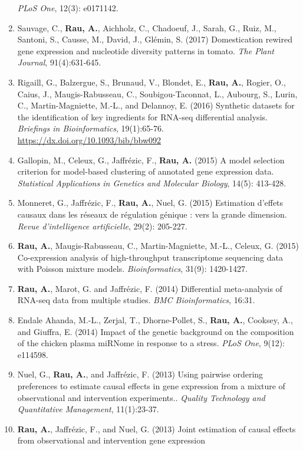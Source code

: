 \documentclass[11pt, a4paper]{awesome-cv}
\begin{document}
\begin{enumerate}
  \emph{PLoS One}, 12(3): e0171142.
\item
  Sauvage, C., \textbf{Rau, A.}, Aichholz, C., Chadoeuf, J., Sarah, G.,
  Ruiz, M., Santoni, S., Causse, M., David, J., Glémin, S. (2017)
  Domestication rewired gene expression and nucleotide diversity
  patterns in tomato. \emph{The Plant Journal}, 91(4):631-645.
\item
  Rigaill, G., Balzergue, S., Brunaud, V., Blondet, E., \textbf{Rau,
  A.}, Rogier, O., Caius, J., Maugis-Rabusseau, C., Soubigou-Taconnat,
  L., Aubourg, S., Lurin, C., Martin-Magniette, M.-L., and Delannoy, E.
  (2016) Synthetic datasets for the identification of key ingredients
  for RNA-seq differential analysis. \emph{Briefings in Bioinformatics},
  19(1):65-76. \url{https://dx.doi.org/10.1093/bib/bbw092}
\item
  Gallopin, M., Celeux, G., Jaffrézic, F., \textbf{Rau, A.} (2015) A
  model selection criterion for model-based clustering of annotated gene
  expression data. \emph{Statistical Applications in Genetics and
  Molecular Biology}, 14(5): 413-428.
\item
  Monneret, G., Jaffrézic, F., \textbf{Rau, A.}, Nuel, G. (2015)
  Estimation d'effets causaux dans les réseaux de régulation génique :
  vers la grande dimension. \emph{Revue d'intelligence artificielle},
  29(2): 205-227.
\item
  \textbf{Rau, A.}, Maugis-Rabusseau, C., Martin-Magniette, M.-L.,
  Celeux, G. (2015) Co-expression analysis of high-throughput
  transcriptome sequencing data with Poisson mixture models.
  \emph{Bioinformatics}, 31(9): 1420-1427.
\item
  \textbf{Rau, A.}, Marot, G. and Jaffrézic, F. (2014) Differential
  meta-analysis of RNA-seq data from multiple studies. \emph{BMC
  Bioinformatics}, 16:31.
\item
  Endale Ahanda, M.-L., Zerjal, T., Dhorne-Pollet, S., \textbf{Rau, A.},
  Cooksey, A., and Giuffra, E. (2014) Impact of the genetic background
  on the composition of the chicken plasma miRNome in response to a
  stress. \emph{PLoS One}, 9(12): e114598.
\item
  Nuel, G., \textbf{Rau, A.}, and Jaffrézic, F. (2013) Using pairwise
  ordering preferences to estimate causal effects in gene expression
  from a mixture of observational and intervention experiments..
  \emph{Quality Technology and Quantitative Management}, 11(1):23-37.
\item
  \textbf{Rau, A.}, Jaffrézic, F., and Nuel, G. (2013) Joint estimation
  of causal effects from observational and intervention gene expression

\end{enumerate}
\end{document}

